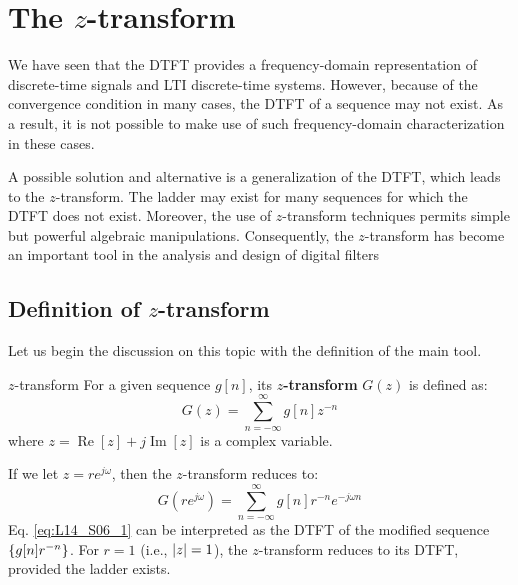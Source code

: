 \documentclass[../../main/main.tex]{subfiles}
\begin{document}
\chapter{\boldmath The \( z \)-transform}


We have seen that the DTFT provides a frequency-domain representation of discrete-time signals and LTI discrete-time systems. However, because of the convergence condition in many cases, the DTFT of a sequence may not exist. As a result, it is not possible to make use of such frequency-domain characterization in these cases.

A possible solution and alternative is a generalization of the DTFT, which leads to the \( z \)-transform. The ladder may exist for many sequences for which the DTFT does not exist. Moreover, the use of \( z \)-transform techniques permits simple but powerful algebraic manipulations. Consequently, the \( z \)-transform has become an important tool in the analysis and design of digital filters





\section{\boldmath Definition of \( z \)-transform}
Let us begin the discussion on this topic with the definition of the main tool.
\begin{definition}{\boldmath \( z \)-transform}{}
    For a given sequence \( g[n] \), its \textbf{\boldmath\( z \)-transform} \( G(z) \) is defined as:
    \begin{equation}
        G(z)
        =
        \sum_{n=-\infty}^{\infty} g[n] z^{-n}
        \label{eq:L14_S05_1}
    \end{equation}
    where \( z = \operatorname{Re}[z] + j\operatorname{Im}[z] \) is a complex variable.
\end{definition}

If we let \( z = re^{j\omega} \), then the \( z \)-transform reduces to:
\begin{equation}
    G(re^{j\omega})
    =
    \sum_{n=-\infty}^{\infty} g[n] r^{-n} e^{-j\omega n}
    \label{eq:L14_S06_1}
\end{equation}
Eq. \ref{eq:L14_S06_1} can be interpreted as the DTFT of the modified sequence \( \qty{g[n]r^{-n}} \). For \( r = 1 \) (i.e., \( \abs{z} = 1 \)), the \( z \)-transform reduces to its DTFT, provided the ladder exists.
\end{document}
